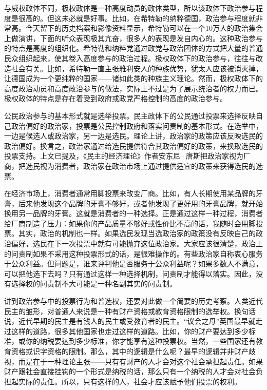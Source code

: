 {与威权政体不同，极权政体是一种高度动员的政体类型，所以该政体下政治参与程度是很高的。但这未必就是好事。比如，在希特勒的纳粹德国，政治参与程度就非常高。今天留下的历史档案和影像资料显示，希特勒可以在一个10万人的政治集会上做演讲，下面的听众表现极其亢奋，很多人的表现是发自内心的。这种政治参与的特点是高度的组织化。希特勒和纳粹党通过政党与政治团体的方式把大量的普通民众组织起来，使其卷入高度参与的政治过程。极权政体下的政治参与，往往与改造社会有关。比如，希特勒一直主张雅利安人的种族优势，犹太人应该被消灭掉，让德国成为一个更纯粹的国家——诸如此类的种族主义理论。然而，极权政体下的高度政治动员和高度政治参与的做法，实际上不过是为了展示统治者的权力而已。极权政体的特点是存在着受到政府或政党严格控制的高度的政治参与。


公民政治参与的基本形式就是选举投票。民主政体下的公民通过投票来选择反映自己政治偏好的政治家，投票是公民控制政府和落实问责制的基本形式。在选举中，一边是候选人或政治家，另一边是选民。理论上讲，政治家的政策应该反映选民的政治偏好。换言之，政治家通过给选民提供符合其政治偏好的政策，来换取选民的投票支持。上文已提及，《民主的经济理论》作者安东尼·唐斯把政治家视为厂商，把选民视为消费者，政治家在政治市场上通过提供适宜的政策来获得选民的选票。

在经济市场上，消费者通常用脚投票来改变厂商。比如，有人长期使用某品牌的牙膏，后来他发现这个品牌的牙膏不够好，或者他发现了更好用的牙膏品牌，就开始换用另一品牌的牙膏。这就是消费者的一种选择。正是通过这样一种过程，消费者给厂商制造了压力：如果你的产品质量不够好或性价比不高的话，我随时会用脚投票。其实，政治的机制也一样。如果选民发现当选政治家的政策没有反映自己的政治偏好，选民在下一次投票中就有可能抛弃这位政治家。大家应该很清楚，政治上的问责制如果不采用这种投票形式的话，是很难操作的。有些政治家自称衷心服务于公众利益。但问题是，谁来评判他是否服务于公众利益呢？如果多数人不满意，可以把他选下去吗？只有通过这样一种选择机制，问责制才能得以落实。因此，没有选择权的问责制不大可能是一种名副其实的问责制。

讲到政治参与中的投票行为和普选权，还要对此做一个简要的历史考察。人类近代民主的雏形，对普通人来说是一种有财产资格或教育资格限制的选举权。换句话说，近代早期的民主是有钱人的民主或受教育者的民主。“议会之母”英国最早就走过这样的道路，很多其他国家也走过这样的道路。比如，你的财产要达到多少标准，或你的纳税要达到多少标准，你才能享有这种投票权。当然，一些国家还有教育资格或识字资格的限制。那么，其中的逻辑是什么呢？最早的逻辑并非财产歧视，而是在于一种理论主张——只有有财产的人才会对这个社会承担起责任。如果财产跟社会直接挂钩的一个形式是纳税的话，那么只有一个纳税的人才会对社会负担起实际的责任。所以，只有这样的人，社会才应该赋予他们投票的权利。

}
